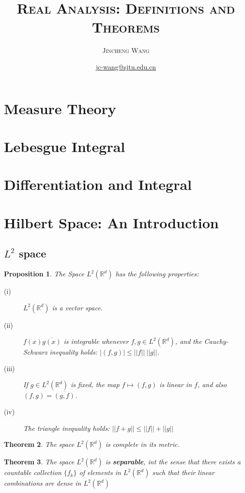 \documentclass[11pt]{article}
\title{\textsc{Real Analysis: Definitions and Theorems}}
\author{\textsc{Jincheng Wang}}
\date{\url{jc-wang@sjtu.edu.cn}}
\newtheorem{theorem}{Theorem}[subsection]
\newtheorem{proposition}[theorem]{Proposition}
\begin{document}
\maketitle
\section{Measure Theory}
\section{Lebesgue Integral}
\section{Differentiation and Integral}
\section{Hilbert Space: An Introduction}
\subsection{$L^2$ space}
\begin{proposition}
    The Space $L^2(\mathbb{R}^d)$ has the following properties:
    \begin{description}
        \item[(i)] $L^2(\mathbb{R}^d)$ is a vector space.
        \item[(ii)]$f(x)\overline{g(x)}$ is integrable whenever $f,g\in L^2(\mathbb{R}^d)$, and the Cauchy-Schwarz inequality holds: $|(f,g)|\leq ||f||\ ||g||$.
        \item[(iii)]  If $g\in L^2(\mathbb{R}^d)$ is fixed, the map $f\mapsto (f,g)$ is linear in $f$, and also $(f,g)=\overline{(g,f)}$.
        \item[(iv)] The triangle inequality holds: $||f+g||\leq||f||+||g||$
    \end{description}
\end{proposition}

\begin{theorem}
    The space $L^2(\mathbb{R}^d)$ is complete in its metric.
\end{theorem}

\begin{theorem}
    The space $L^2(\mathbb{R}^d)$ is \textbf{separable}, int the sense that there exists a countable collection $\{f_k\}$ of elements in $L^2(\mathbb{R}^d)$ such that their linear combinations are dense in $L^2(\mathbb{R}^d)$
\end{theorem}
\end{document}

